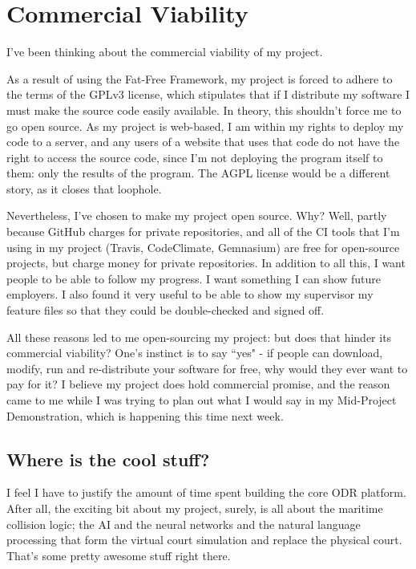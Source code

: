 \chapter{Commercial Viability} \label{appendix:commercialViability}

I've been thinking about the commercial viability of my project.

As a result of using the Fat-Free Framework, my project is forced to adhere to the terms of the GPLv3 license, which stipulates that if I distribute my software I must make the source code easily available. In theory, this shouldn't force me to go open source. As my project is web-based, I am within my rights to deploy my code to a server, and any users of a website that uses that code do not have the right to access the source code, since I'm not deploying the program itself to them: only the results of the program. The AGPL license would be a different story, as it closes that loophole.

Nevertheless, I've chosen to make my project open source. Why? Well, partly because GitHub charges for private repositories, and all of the CI tools that I'm using in my project (Travis, CodeClimate, Gemnasium) are free for open-source projects, but charge money for private repositories. In addition to all this, I want people to be able to follow my progress. I want something I can show future employers. I also found it very useful to be able to show my supervisor my feature files so that they could be double-checked and signed off.

All these reasons led to me open-sourcing my project: but does that hinder its commercial viability? One's instinct is to say ``yes" - if people can download, modify, run and re-distribute your software for free, why would they ever want to pay for it? I believe my project does hold commercial promise, and the reason came to me while I was trying to plan out what I would say in my Mid-Project Demonstration, which is happening this time next week.

\section{Where is the cool stuff?}

I feel I have to justify the amount of time spent building the core ODR platform. After all, the exciting bit about my project, surely, is all about the maritime collision logic; the AI and the neural networks and the natural language processing that form the virtual court simulation and replace the physical court. That's some pretty awesome stuff right there.

